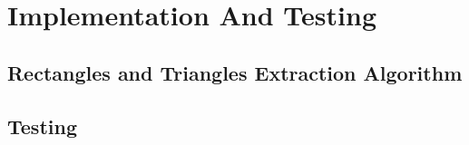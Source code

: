 \chapter{Implementation And Testing}\label{impl_test}

		


	\section{Rectangles and Triangles Extraction Algorithm} 	
	


	\section{Testing}
